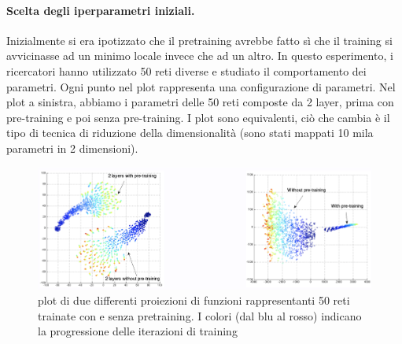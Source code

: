 \paragraph{Scelta degli iperparametri iniziali.} Inizialmente si era ipotizzato che il pretraining 
avrebbe fatto sì che il training si avvicinasse ad un minimo locale invece che ad un altro. In questo
esperimento, i ricercatori hanno utilizzato 50 reti diverse e studiato il comportamento dei parametri. 
Ogni punto nel plot rappresenta una configurazione di parametri. Nel plot a sinistra, abbiamo i parametri 
delle 50 reti composte da 2 layer, prima con pre-training e poi senza pre-training. I plot sono equivalenti,
ciò che cambia è il tipo di tecnica di riduzione della dimensionalità (sono stati mappati 10 mila parametri in 
2 dimensioni).
\begin{figure}[!h]
  \includegraphics[scale=.5]{images/representation_learning/choice}
  \caption{plot di due differenti proiezioni di funzioni rappresentanti 50 reti trainate con e senza
  pretraining. I colori (dal blu al rosso) indicano la progressione delle iterazioni di training}
  \centering
\end{figure}
\newpage

